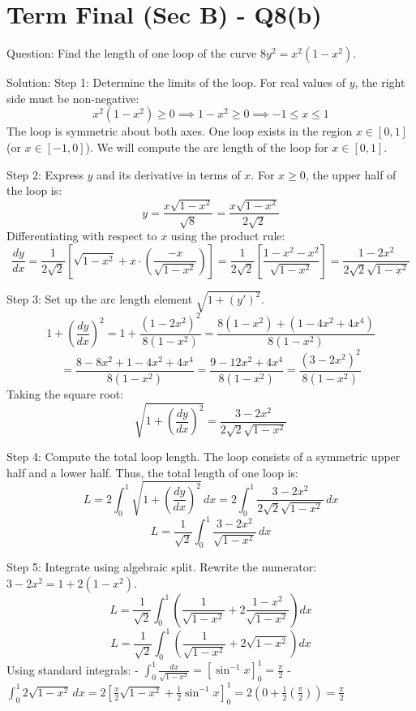 \documentclass{article}
\begin{document}
\section*{Term Final (Sec B) - Q8(b)}
Question:
Find the length of one loop of the curve $8y^2 = x^2(1-x^2)$.

Solution:
Step 1: Determine the limits of the loop.
For real values of $y$, the right side must be non-negative:
\[
x^2(1-x^2) \ge 0 \implies 1-x^2 \ge 0 \implies -1 \le x \le 1
\]
The loop is symmetric about both axes. One loop exists in the region $x \in [0, 1]$ (or $x \in [-1, 0]$). We will compute the arc length of the loop for $x \in [0, 1]$.

Step 2: Express $y$ and its derivative in terms of $x$.
For $x \ge 0$, the upper half of the loop is:
\[
y = \frac{x\sqrt{1-x^2}}{\sqrt{8}} = \frac{x\sqrt{1-x^2}}{2\sqrt{2}}
\]
Differentiating with respect to $x$ using the product rule:
\[
\frac{dy}{dx} = \frac{1}{2\sqrt{2}} \left[ \sqrt{1-x^2} + x \cdot \left(\frac{-x}{\sqrt{1-x^2}}\right) \right] = \frac{1}{2\sqrt{2}} \left[ \frac{1-x^2-x^2}{\sqrt{1-x^2}} \right] = \frac{1-2x^2}{2\sqrt{2}\sqrt{1-x^2}}
\]

Step 3: Set up the arc length element $\sqrt{1 + (y')^2}$.
\[
1 + \left(\frac{dy}{dx}\right)^2 = 1 + \frac{(1-2x^2)^2}{8(1-x^2)} = \frac{8(1-x^2) + (1 - 4x^2 + 4x^4)}{8(1-x^2)}
\]
\[
= \frac{8 - 8x^2 + 1 - 4x^2 + 4x^4}{8(1-x^2)} = \frac{9 - 12x^2 + 4x^4}{8(1-x^2)} = \frac{(3-2x^2)^2}{8(1-x^2)}
\]
Taking the square root:
\[
\sqrt{1 + \left(\frac{dy}{dx}\right)^2} = \frac{3-2x^2}{2\sqrt{2}\sqrt{1-x^2}}
\]

Step 4: Compute the total loop length.
The loop consists of a symmetric upper half and a lower half. Thus, the total length of one loop is:
\[
L = 2 \int_{0}^{1} \sqrt{1 + \left(\frac{dy}{dx}\right)^2} \, dx = 2 \int_{0}^{1} \frac{3-2x^2}{2\sqrt{2}\sqrt{1-x^2}} \, dx
\]
\[
L = \frac{1}{\sqrt{2}} \int_{0}^{1} \frac{3-2x^2}{\sqrt{1-x^2}} \, dx
\]

Step 5: Integrate using algebraic split.
Rewrite the numerator: $3-2x^2 = 1 + 2(1-x^2)$.
\[
L = \frac{1}{\sqrt{2}} \int_{0}^{1} \left( \frac{1}{\sqrt{1-x^2}} + 2\frac{1-x^2}{\sqrt{1-x^2}} \right) dx
\]
\[
L = \frac{1}{\sqrt{2}} \int_{0}^{1} \left( \frac{1}{\sqrt{1-x^2}} + 2\sqrt{1-x^2} \right) dx
\]
Using standard integrals:
- $\int_0^1 \frac{dx}{\sqrt{1-x^2}} = [\sin^{-1} x]_0^1 = \frac{\pi}{2}$
- $\int_0^1 2\sqrt{1-x^2} \, dx = 2\left[\frac{x}{2}\sqrt{1-x^2} + \frac{1}{2}\sin^{-1} x\right]_0^1 = 2\left(0 + \frac{1}{2}\left(\frac{\pi}{2}\right)\right) = \frac{\pi}{2}$
\end{document}
